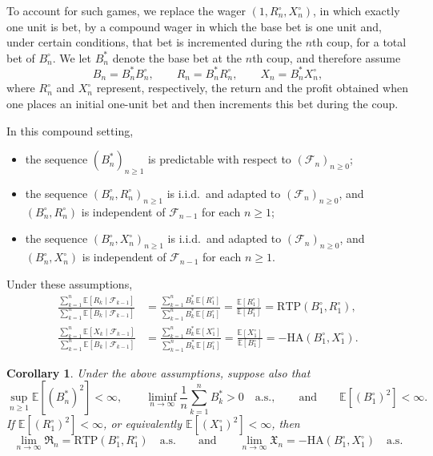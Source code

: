 \documentclass{article}
\newtheorem{corollary}[theorem]{Corollary}
\theoremstyle{definition}
\theoremstyle{remark}
\newcommand{\E}{\mathbb{E}}
\newcommand{\F}{\mathscr{F}}
\newcommand{\RTP}{\mathrm{RTP}}
\newcommand{\HA}{\mathrm{HA}}
\begin{document}
To account for such games, we replace the wager $(1,R_n^\circ,X_n^\circ)$, in which exactly one unit is bet, by a compound wager in which the base bet is one unit and, under certain conditions, that bet is incremented during the $n$th coup, for a total bet of $B_n^\circ$.
We let $B_n^*$ denote the base bet at the $n$th coup, and therefore assume
\begin{equation*}
B_n = B_n^* B_n^\circ, \qquad
R_n = B_n^* R_n^\circ, \qquad
X_n = B_n^* X_n^\circ,
\end{equation*}
where $R_n^\circ$ and $X_n^\circ$ represent, respectively, the return and the profit obtained when one places an initial one-unit bet and then increments this bet during the coup.



In this compound setting,
\begin{itemize}
    \item the sequence $(B_n^*)_{n\ge1}$ is predictable with respect to $(\F_n)_{n\ge0}$;
    \item the sequence $(B_n^\circ,R_n^\circ)_{n\ge1}$ is i.i.d.\ and adapted to $(\F_n)_{n\ge0}$, and $(B_n^\circ,R_n^\circ)$ is independent of $\F_{n-1}$ for each $n\ge1$;
     \item the sequence $(B_n^\circ,X_n^\circ)_{n\ge1}$ is i.i.d.\ and adapted to $(\F_n)_{n\ge0}$, and $(B_n^\circ,X_n^\circ)$ is independent of $\F_{n-1}$ for each $n\ge1$.
\end{itemize}

Under these assumptions,
\begin{align*}
\frac{\sum_{k=1}^n \E[R_k\mid\F_{k-1}]}{\sum_{k=1}^n \E[B_k\mid\F_{k-1}]}&=\frac{\sum_{k=1}^n B_k^*\,\E[R_1^\circ]}{\sum_{k=1}^n B_k^*\,\E[B_1^\circ]}=\frac{\E[R_1^\circ]}{\E[B_1^\circ]}=\RTP(B_1^\circ,R_1^\circ),\\
\frac{\sum_{k=1}^n \E[X_k\mid\F_{k-1}]}{\sum_{k=1}^n \E[B_k\mid\F_{k-1}]}&=\frac{\sum_{k=1}^n B_k^*\,\E[X_1^\circ]}{\sum_{k=1}^n B_k^*\,\E[B_1^\circ]}=\frac{\E[X_1^\circ]}{\E[B_1^\circ]}=-\HA(B_1^\circ,X_1^\circ).
\end{align*}

\begin{corollary}\label{cor:one_bet_compound}
Under the above assumptions, suppose also that 
\[
\sup_{n \ge 1} \E[(B_n^*)^2] < \infty,\qquad\liminf_{n\to\infty}\frac{1}{n}\sum_{k=1}^n B_k^*>0\quad\text{a.s.}, \qquad\text{and} \qquad \E[(B_1^\circ)^2]<\infty.
\]
If $\E[(R_1^\circ)^2] < \infty$, or equivalently $\E[(X_1^\circ)^2] < \infty$, then
    \[
    \lim_{n\to\infty}\mathfrak{R}_n=\RTP(B_1^\circ,R_1^\circ)\quad\text{a.s.} \qquad \text{and} \qquad \lim_{n\to\infty}\mathfrak{X}_n=-\HA(B_1^\circ,X_1^\circ)\quad\text{a.s.}
        \]
\end{corollary}
\end{document}
